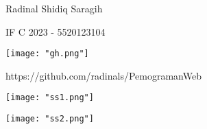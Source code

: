 \documentclass[12pt,a4paper]{article}
\date{}
\begin{document}
Radinal Shidiq Saragih

IF C 2023 - 5520123104


\begin{center}
  \texttt{[image: "gh.png"]}
  \caption{ https://github.com/radinals/PemogramanWeb }
\end{center}


\begin{center}
  \texttt{[image: "ss1.png"]}
\end{center}

%

%

%

\begin{center}
  \texttt{[image: "ss2.png"]}
\end{center}
\end{document}
